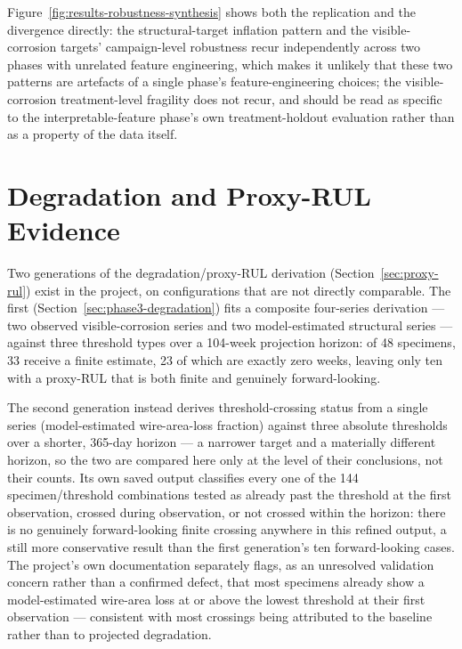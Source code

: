 Figure~\ref{fig:results-robustness-synthesis} shows both the replication
and the divergence directly: the structural-target inflation pattern and
the visible-corrosion targets' campaign-level robustness recur
independently across two phases with unrelated feature engineering, which
makes it unlikely that these two patterns are artefacts of a single
phase's feature-engineering choices; the visible-corrosion treatment-level
fragility does not recur, and should be read as specific to the
interpretable-feature phase's own treatment-holdout evaluation rather than
as a property of the data itself.

\section{Degradation and Proxy-RUL Evidence}
\label{sec:results-degradation}

Two generations of the degradation/proxy-RUL derivation
(Section~\ref{sec:proxy-rul}) exist in the project, on configurations that
are not directly comparable. The first
(Section~\ref{sec:phase3-degradation}) fits a composite four-series
derivation — two observed visible-corrosion series and two model-estimated
structural series — against three threshold types over a 104-week
projection horizon: of 48 specimens, 33 receive a finite estimate, 23 of
which are exactly zero weeks, leaving only ten with a proxy-RUL that is
both finite and genuinely forward-looking.

The second generation instead derives threshold-crossing status from a
single series (model-estimated wire-area-loss fraction) against three
absolute thresholds over a shorter, 365-day horizon — a narrower target
and a materially different horizon, so the two are compared here only at
the level of their conclusions, not their counts. Its own saved output
classifies every one of the 144 specimen/threshold combinations tested as
already past the threshold at the first observation, crossed during
observation, or not crossed within the horizon: there is no genuinely
forward-looking finite crossing anywhere in this refined output, a still
more conservative result than the first generation's ten forward-looking
cases. The project's own documentation separately flags, as an unresolved
validation concern rather than a confirmed defect, that most specimens
already show a model-estimated wire-area loss at or above the lowest
threshold at their first observation — consistent with most crossings
being attributed to the baseline rather than to projected degradation.

